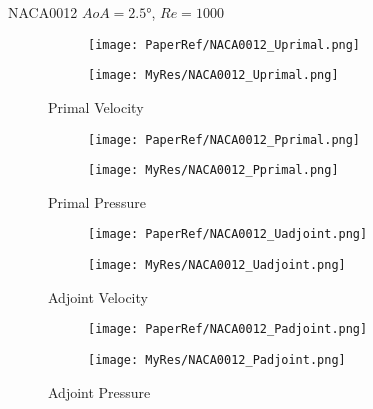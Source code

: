 \begin{frame}{NACA0012 $AoA=\ang{2.5}$, $Re=1000$}
\begin{figure}[h]
    \centering          
    \begin{subfigure}[h]{0.45\textwidth}
             \centering
        \texttt{[image: PaperRef/NACA0012\_Uprimal.png]}
   \end{subfigure}
   \hfill	
   \begin{subfigure}[h]{0.45\textwidth}
            \centering
       \texttt{[image: MyRes/NACA0012\_Uprimal.png]}
    \end{subfigure}
    \caption{Primal Velocity}
    \end{figure} 
\end{frame}

\begin{frame}
\begin{figure}[h]
    \centering          
    \begin{subfigure}[h]{0.45\textwidth}
             \centering
        \texttt{[image: PaperRef/NACA0012\_Pprimal.png]}
   \end{subfigure}
   \hfill	
   \begin{subfigure}[h]{0.45\textwidth}
            \centering
       \texttt{[image: MyRes/NACA0012\_Pprimal.png]}
    \end{subfigure}
    \caption{Primal Pressure}
    \end{figure} 
\end{frame}

\begin{frame}
\begin{figure}[h]
    \centering          
    \begin{subfigure}[h]{0.45\textwidth}
             \centering
        \texttt{[image: PaperRef/NACA0012\_Uadjoint.png]}
   \end{subfigure}
   \hfill	
   \begin{subfigure}[h]{0.45\textwidth}
            \centering
       \texttt{[image: MyRes/NACA0012\_Uadjoint.png]}
    \end{subfigure}
    \caption{Adjoint Velocity}
    \end{figure} 
\end{frame}

\begin{frame}
\begin{figure}[h]
    \centering          
    \begin{subfigure}[h]{0.45\textwidth}
             \centering
        \texttt{[image: PaperRef/NACA0012\_Padjoint.png]}
   \end{subfigure}
   \hfill	
   \begin{subfigure}[h]{0.45\textwidth}
            \centering
       \texttt{[image: MyRes/NACA0012\_Padjoint.png]}
    \end{subfigure}
    \caption{Adjoint Pressure}
    \end{figure} 
\end{frame}


